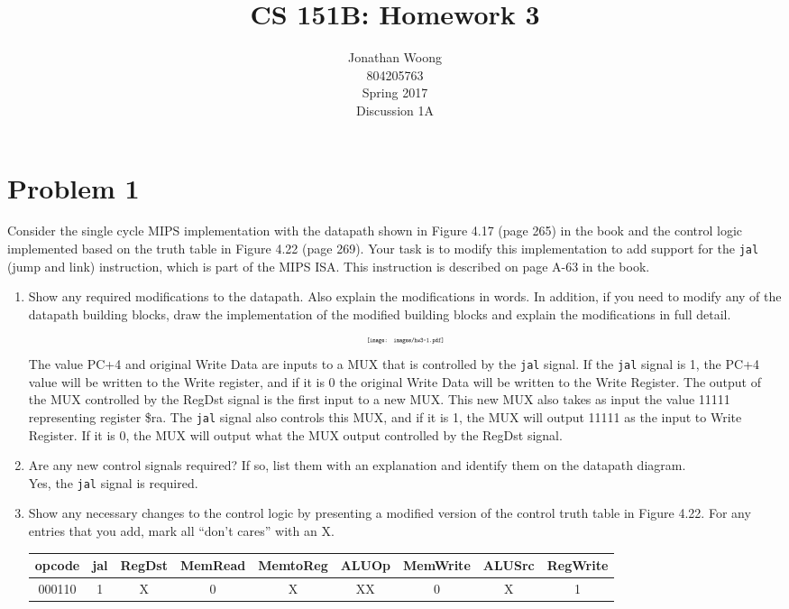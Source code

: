 \documentclass[10pt,letterpaper]{article}
\date{\displaydate{date}}
\begin{document}
\title{CS 151B: Homework 3}
\author{
	Jonathan Woong\\
	804205763\\
	Spring 2017\\
	Discussion 1A}
\maketitle
\pagebreak


\section{Problem 1}
Consider the single cycle MIPS implementation with the datapath shown in Figure 4.17 (page 265) in the book and the control logic implemented based on the truth table in Figure 4.22 (page 269). Your task is to modify this implementation to add support for the \texttt{jal} (jump and link) instruction, which is part of the MIPS ISA. This instruction is described on page A-63 in the book.
\begin{enumerate}[label=\Alph*)]
\item Show any required modifications to the datapath. Also explain the modifications in words. In addition, if you need to modify any of the datapath building blocks, draw the implementation of the modified building blocks and explain the modifications in full detail.
\[\scalebox{0.45}{
\texttt{[image: images/hw3-1.pdf]}
}\]
The value PC+4 and original Write Data are inputs to a MUX that is controlled by the \texttt{jal} signal. If the \texttt{jal} signal is 1, the PC+4 value will be written to the Write register, and if it is 0 the original Write Data will be written to the Write Register. The output of the MUX controlled by the RegDst signal is the first input to a new MUX. This new MUX also takes as input the value 11111 representing register \$ra. The \texttt{jal} signal also controls this MUX, and if it is 1, the MUX will output 11111 as the input to Write Register. If it is 0, the MUX will output what the MUX output controlled by the RegDst signal.
\item Are any new control signals required? If so, list them with an explanation and identify them on the datapath diagram.\\
Yes, the \texttt{jal} signal is required.
\item Show any necessary changes to the control logic by presenting a modified version of the control truth table in Figure 4.22. For any entries that you add, mark all ``don't cares'' with an X.
\begin{center}
\begin{tabular} { |c|c|c|c|c|c|c|c|c| }
\hline
opcode & jal & RegDst & MemRead & MemtoReg & ALUOp & MemWrite & ALUSrc & RegWrite \\
\hline
000110 & 1 & X & 0 & X & XX & 0 & X & 1 \\
\hline
\end{tabular}
\end{center}
\end{enumerate}
\pagebreak
\end{document}
